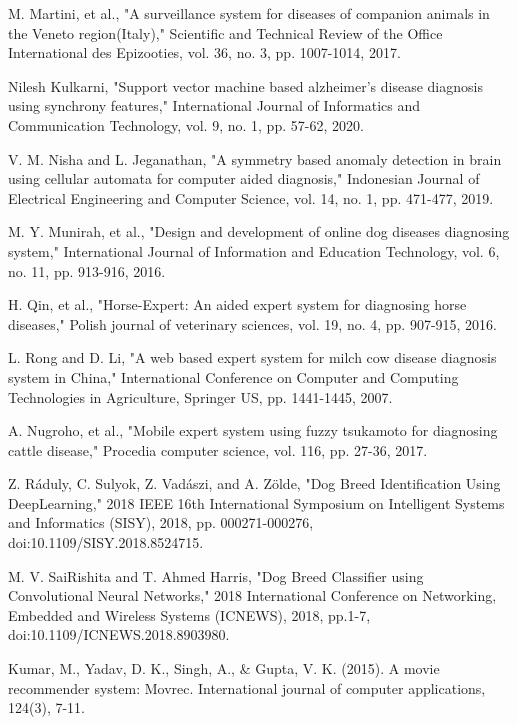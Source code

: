 \begin{thebibliography}{99}
     M. Martini, et al., "A surveillance system for diseases of companion animals in the Veneto region(Italy)," Scientific
    and Technical Review of the Office International des Epizooties, vol. 36, no. 3, pp. 1007-1014, 2017.

    Nilesh Kulkarni, "Support vector machine based alzheimer's disease diagnosis using synchrony features," International Journal of Informatics and Communication Technology, vol. 9, no. 1, pp. 57-62, 2020.
   
     V. M. Nisha and L. Jeganathan, "A symmetry based anomaly detection in brain using cellular automata for computer
    aided diagnosis," Indonesian Journal of Electrical Engineering and Computer Science, vol. 14, no. 1, pp. 471-477, 2019.
   
    M. Y. Munirah, et al., "Design and development of online dog diseases diagnosing system," International Journal of Information and Education Technology, vol. 6, no. 11, pp. 913-916, 2016.

    H. Qin, et al., "Horse-Expert: An aided expert system for diagnosing horse diseases," Polish journal of veterinary sciences, vol. 19, no. 4, pp. 907-915, 2016.

    L. Rong and D. Li, "A web based expert system for milch cow disease diagnosis system in China," International Conference on Computer and Computing Technologies in Agriculture, Springer US, pp. 1441-1445, 2007.

    A. Nugroho, et al., "Mobile expert system using fuzzy tsukamoto for diagnosing cattle disease," Procedia computer science, vol. 116, pp. 27-36, 2017.

    Z. Ráduly, C. Sulyok, Z. Vadászi, and A. Zölde, "Dog Breed 
    Identification Using DeepLearning," 2018 IEEE 16th International Symposium on
    Intelligent Systems and Informatics (SISY), 2018, pp. 000271-000276, doi:10.1109/SISY.2018.8524715. 
    
    M. V. SaiRishita and T. Ahmed Harris, "Dog Breed Classifier using Convolutional Neural Networks," 2018 International Conference on
    Networking, Embedded and Wireless Systems (ICNEWS), 2018, pp.1-7, doi:10.1109/ICNEWS.2018.8903980.

 
    Kumar, M., Yadav, D. K., Singh, A., \& Gupta, V. K. (2015). A movie recommender system: Movrec. International journal of computer applications, 124(3), 7-11. 
   

\end{thebibliography}
